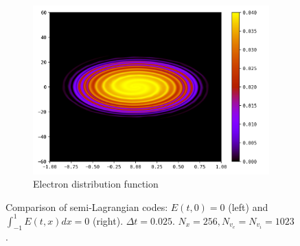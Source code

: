 \documentclass{article}
\numberwithin{equation}{section}
\newcommand{\imh}{\textheight} %
\newcommand{\imw}{\textwidth} %
\begin{document}
\begin{figure}
\begin{subfigure}{\textwidth}
		\includegraphics[height=\imh,width=\imw]{images/feT20_run5af_2.png}
		\caption{Electron distribution function}
	\end{subfigure}
	\caption{Comparison of semi-Lagrangian codes: $E(t,0)=0$ (left) and $\int_{-1}^1E(t,x)dx=0$ (right).
	 $\Delta t=0.025$. $N_x=256, N_{v_e}=N_{v_i}=1023$.}
	\label{fig:comp_E0_intE0}
\end{figure}  





\end{document}
